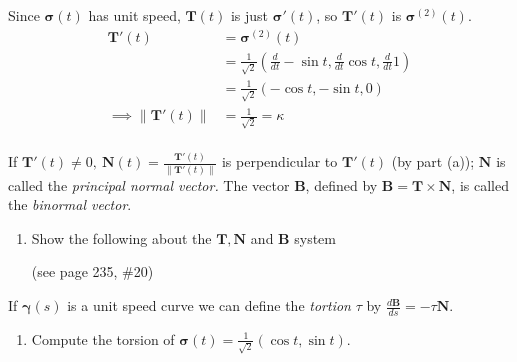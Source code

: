 \documentclass{article}
\newcommand{\norm}[1]{\| #1 \|}
\newcommand{\deriv}[1]{\frac{d}{d #1}}
\newcommand{\gam}{\boldsymbol{\gamma}}
\begin{document}
\begin{enumerate}
\begin{enumerate}[resume]
\begin{enumerate}[label=(\roman*)]
                        Since $\boldsymbol{\sigma}(t)$ has unit speed, $\boldsymbol{T}(t)$ is just $\boldsymbol{\sigma}'(t)$, so $\boldsymbol{T}'(t)$ is $\boldsymbol{\sigma}^{(2)}(t)$.
                        \begin{align*}
                            \boldsymbol{T}'(t) &= \boldsymbol{\sigma}^{(2)}(t) \\
                            &= \frac{1}{\sqrt{2}}(\deriv{t} - \sin t,\deriv{t}  \cos t, \deriv{t} 1) \\
                            &= \frac{1}{\sqrt{2}}(- \cos t, - \sin t, 0) \\
                            \implies \norm{\boldsymbol{T}'(t)} &= \frac{1}{\sqrt{2}} = \kappa \\
                        \end{align*}
                \end{enumerate}
        \end{enumerate}
        If $\displaystyle \boldsymbol{T}'(t) \not = 0, \: \boldsymbol{N}(t) = \frac{\boldsymbol{T}'(t)}{\norm{\boldsymbol{T}'(t)}}$ is perpendicular to $\boldsymbol{T}'(t)$ (by part (a)); $\boldsymbol{N}$ is called the \textit{principal normal vector.} The vector $\boldsymbol{B}$, defined by $\boldsymbol{B} = \boldsymbol{T} \times \boldsymbol{N}$, is called the \textit{binormal vector}.
        \begin{enumerate}[resume] 
            \item Show the following about the $\boldsymbol{T}, \boldsymbol{N}$ and $\boldsymbol{B}$ system


                (see page 235, \#20)

        \end{enumerate}
        If $\gam(s)$ is a unit speed curve we can define the \textit{tortion} $\tau$ by $\frac{d \boldsymbol{B}}{ds} = - \tau \boldsymbol{N}$.
        \begin{enumerate}[resume] 
            \item Compute the torsion of $\boldsymbol{\sigma}(t) = \frac{1}{\sqrt{2}}(\cos t, \sin t)$.


\end{enumerate}
\end{enumerate}
\end{document}
